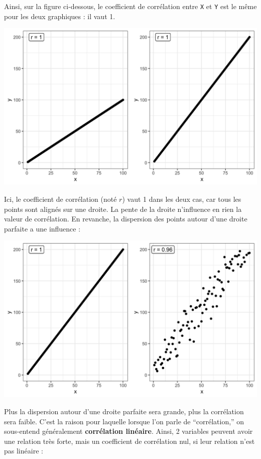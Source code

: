 \documentclass[
  a4paper,
]{article}
\begin{document}
Ainsi, sur la figure ci-dessous, le coefficient de corrélation entre \texttt{X} et \texttt{Y} est le même pour les deux graphiques : il vaut 1.

\begin{center}\includegraphics[width=0.9\linewidth]{figure/unnamed-chunk-96-1} \end{center}

Ici, le coefficient de corrélation (noté \(r\)) vaut 1 dans les deux cas, car tous les points sont alignés sur une droite. La pente de la droite n'influence en rien la valeur de corrélation. En revanche, la dispersion des points autour d'une droite parfaite a une influence :

\begin{center}\includegraphics[width=0.9\linewidth]{figure/unnamed-chunk-97-1} \end{center}

Plus la dispersion autour d'une droite parfaite sera grande, plus la corrélation sera faible. C'est la raison pour laquelle lorsque l'on parle de ``corrélation,'' on sous-entend généralement \textbf{corrélation linéaire}. Ainsi, 2 variables peuvent avoir une relation très forte, mais un coefficient de corrélation nul, si leur relation n'est pas linéaire :
\end{document}
